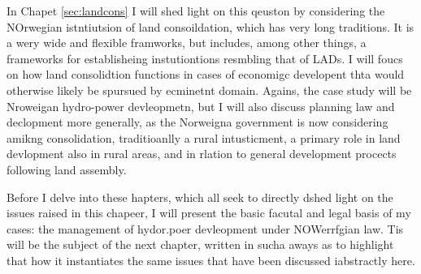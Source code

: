 In Chapet \ref{sec:landcons} I will shed light on this qeuston by considering the NOrwegian istntiutsion of land consoildation, which has very long traditions. It is a wery wide and flexible framworks, but includes, among other things, a frameworks for establisheing instutiontions resmbling that of LADs. I will foucs on how land consolidtion functions in cases of economigc developent thta would otherwise likely be spursued by ecminetnt domain. Agains, the case study will be Nroweigan hydro-power devleopmetn, but I will also discuss planning law and declopment more generally, as the Norweigna government is now considering amikng consolidation, traditioanlly a rural intusticment, a primary role in land devlopment also in rural areas, and in rlation to general development procects following land assembly.

Before I delve into these hapters, which all seek to directly dshed light on the issues raised in this chapeer, I will present the basic facutal and legal basis of my cases: the management of hydor.poer devleopment under NOWerrfgian law. Tis will be the subject of the next chapter, written in sucha  aways as to highlight that how it instantiates the same issues that have been discussed iabstractly here.

